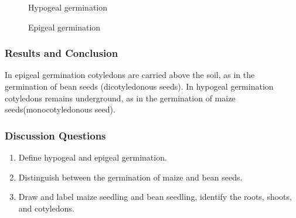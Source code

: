 \begin{figure}[h]
\begin{center}
\def\svgwidth{6cm}

\caption{Hypogeal germination}
\label{fig:hypogeal}
\end{center}
\end{figure}

\begin{figure}[h]
\begin{center}
\def\svgwidth{7cm}

\caption{Epigeal germination}
\label{fig:epigeal}
\end{center}
\end{figure}

\subsubsection*{Results and Conclusion}
In epigeal germination cotyledons are carried above the soil, as in the germination of bean seeds (dicotyledonous seeds). In hypogeal germination cotyledons remains underground, as in the germination of maize seeds(monocotyledonous seed).

\subsubsection*{Discussion Questions}
\begin{enumerate}
\item{Define hypogeal and epigeal germination.}
\item{Distinguish between the germination of maize and bean seeds.}
\item{Draw and label maize seedling and bean seedling, identify the roots, shoots, and cotyledons.}
\end{enumerate}
